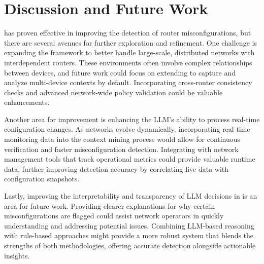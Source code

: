 \section{Discussion and Future Work}
\label{sec:future}

\sysname{} has proven effective in improving the detection of router misconfigurations, but there are several avenues for further exploration and refinement. One challenge is expanding the framework to better handle large-scale, distributed networks with interdependent routers. These environments often involve complex relationships between devices, and future work could focus on extending \sysname{} to capture and analyze multi-device contexts by default. Incorporating cross-router consistency checks and advanced network-wide policy validation could be valuable enhancements.

Another area for improvement is enhancing the LLM's ability to process real-time configuration changes. As networks evolve dynamically, incorporating real-time monitoring data into the context mining process would allow for continuous verification and faster misconfiguration detection. Integrating \sysname{} with network management tools that track operational metrics could provide valuable runtime data, further improving detection accuracy by correlating live data with configuration snapshots.

Lastly, improving the interpretability and transparency of LLM decisions in \sysname{} is an area for future work. Providing clearer explanations for why certain misconfigurations are flagged could assist network operators in quickly understanding and addressing potential issues. Combining LLM-based reasoning with rule-based approaches might provide a more robust system that blends the strengths of both methodologies, offering accurate detection alongside actionable insights.